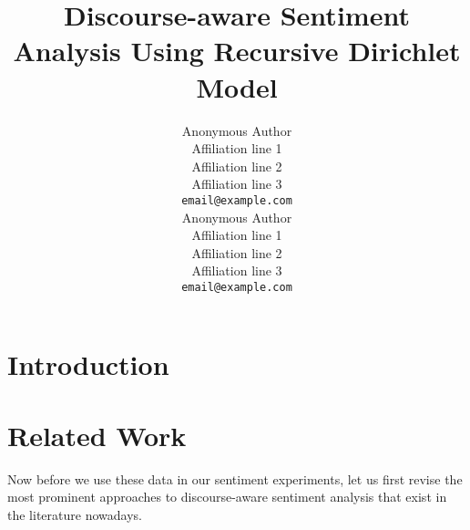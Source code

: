 \documentclass[11pt]{article}
\title{Discourse-aware Sentiment Analysis Using Recursive Dirichlet
  Model}
\author{Anonymous Author\\
  Affiliation line 1 \\
  Affiliation line 2 \\
  Affiliation line 3 \\
  {\tt email@example.com} \\\And{}
  Anonymous Author\\
  Affiliation line 1 \\
  Affiliation line 2 \\
  Affiliation line 3 \\
  {\tt email@example.com} \\}
\date{}
\begin{document}
\maketitle
\begin{abstract}
\end{abstract}

\section{Introduction}\label{intro}


\section{Related Work}\label{relwork}



Now before we use these data in our sentiment experiments, let us
first revise the most prominent approaches to discourse-aware
sentiment analysis that exist in the literature nowadays.
\end{document}
